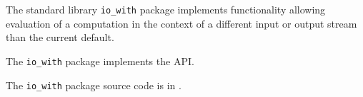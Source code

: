 
The standard library {\tt io\_with} package implements functionality allowing 
evaluation of a computation in the context of a different input or output 
stream than the current default.

The {\tt io\_with} package implements the  API.

The {\tt io\_with} package source code is in .



